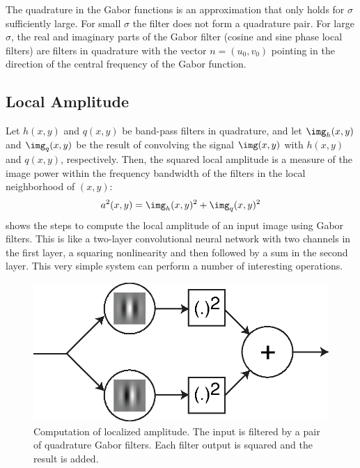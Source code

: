 The quadrature in the Gabor functions is an approximation that only holds for $\sigma$ sufficiently large. For small $\sigma$ the filter does not form a quadrature pair. For large $\sigma$, the real and imaginary parts of the Gabor filter (cosine and sine phase local filters) are filters in quadrature with the vector $n=(u_0,v_0)$ pointing in the direction of the central frequency of the Gabor function.

\subsection{Local Amplitude}

Let $h(x,y)$ and $q(x,y)$ be band-pass filters in quadrature, and let $\img_h(x,y)$ and $\img_q(x,y)$ be the result of convolving the signal $\img(x,y)$ with $h(x,y)$ and $q(x,y)$, respectively.  Then, the squared local amplitude is a measure of the image power within the frequency bandwidth of the filters in the local neighborhood of $(x,y)$:
\begin{equation}
	a^2(x,y) = \img_h(x,y)^2 + \img_q(x,y)^2
\end{equation}
\Fig{\ref{fig:quad2}} shows the steps to compute the local amplitude of an input image using Gabor filters. This is like a two-layer convolutional neural network with two channels in the first layer, a squaring nonlinearity and then followed by a sum in the second layer. This very simple system can perform a number of interesting operations.

\begin{figure}[t]
	\centerline{
		\includegraphics[width=0.5\linewidth]{figures/spatial_filter_sets/gabor_magnitude.eps}}
	\caption{Computation of localized amplitude. The input is filtered by a pair of quadrature Gabor filters. Each filter output is squared and the result is added.}
	\label{fig:quad2}
\end{figure}

